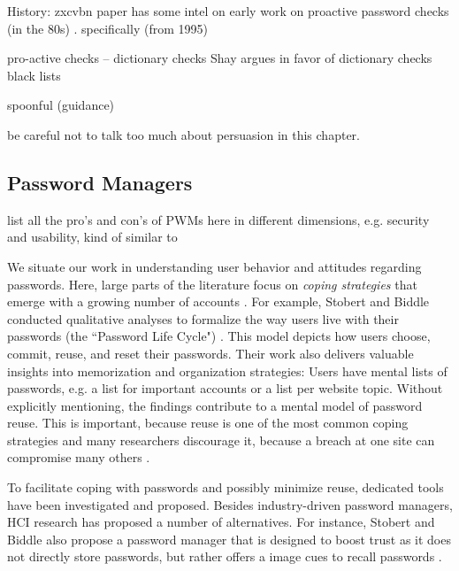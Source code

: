 	
	History: zxcvbn paper has some intel on early work on proactive password checks (in the 80s) \cite{Wheeler2016zxcvbn}. specifically (from 1995) \cite{Bishop1995ProactivePasswordChecking}
	
	
	pro-active checks -- dictionary checks Shay argues in favor of dictionary checks \cite{Shay2014CanLongPasswordsBeSecureAndUsable} 
	black lists \cite{Habib2017Blacklists} 
	
	spoonful (guidance) \cite{Shay2015SpoonfulOfSugar}
	\cite{Forget2008ImprovingPasswordsThroughPersuasion}
	
	be careful not to talk too much about persuasion in this chapter. 
	
	\subsection{Password Managers}
	
	list all the pro's and con's of PWMs here in different dimensions, e.g. security and usability, kind of similar to \cite{Bonneau2012ReplacePasswords}
	
	
	
	We situate our work in understanding user behavior and attitudes regarding passwords. Here, large parts of the literature focus on \textit{coping strategies} that emerge with a growing number of accounts \cite{Florencio2007LargeScaleStudyPasswordHabits, Florencio2014PasswordPortfoliosFiniteUser}. For example, Stobert and Biddle conducted qualitative analyses to formalize the way users live with their passwords (the ``Password Life Cycle") \cite{Stobert2014PasswordLifeCycle}. This model depicts how users choose, commit, reuse, and reset their passwords. Their work also delivers valuable insights into memorization and organization strategies: Users have mental lists of passwords, e.g. a list for important accounts or a list per website topic. Without explicitly mentioning, the findings contribute to a mental model of password reuse. This is important, because reuse is one of the most common coping strategies \cite{Das2014TangledWeb, Gaw2006PasswordManagement, Hayashi2011DiaryStudyPWs} and many researchers discourage it, because a breach at one site can compromise many others \cite{Bonneau2012ScienceOfGuessing, Komanduri2011OfPasswordsAndPeople}. 
	
	To facilitate coping with passwords and possibly minimize reuse, dedicated tools have been investigated and proposed. Besides industry-driven password managers, HCI research has proposed a number of alternatives. For instance, Stobert and Biddle also propose a password manager that is designed to boost trust as it does not directly store passwords, but rather offers a image cues to recall passwords \cite{Stobert2014Versipass}. 
	
